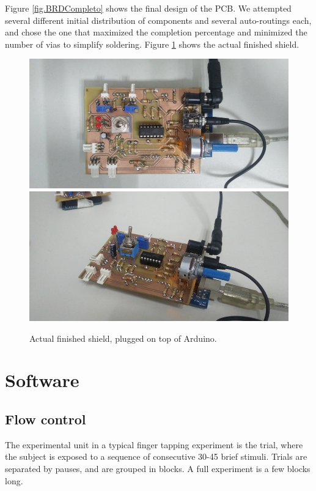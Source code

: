 \documentclass[twocolumn]{article}
\begin{document}
Figure \ref{fig.BRDCompleto} shows the final design of the PCB. We attempted several different initial distribution of components and several auto-routings each, and chose the one that maximized the completion percentage and minimized the number of vias to simplify soldering. Figure \ref{fig.HardwareFinal} shows the actual finished shield.



\begin{figure}[!ht]
    \centering
    \includegraphics[width=0.75\linewidth]{figures/shield_fromabove.jpg}
    \includegraphics[width=0.75\linewidth]{figures/shield_angled.jpg}
    \caption{Actual finished shield, plugged on top of Arduino.}
    \label{fig.HardwareFinal}
\end{figure}






\section{Software}

\subsection{Flow control}

The experimental unit in a typical finger tapping experiment is the trial, where the subject is exposed to a sequence of consecutive 30-45 brief stimuli. Trials are separated by pauses, and are grouped in blocks. A full experiment is a few blocks long.
\end{document}

